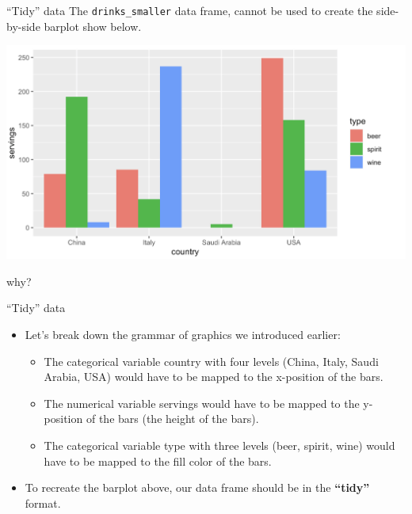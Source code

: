 \documentclass[
  ignorenonframetext,
]{beamer}
\begin{document}
\begin{frame}[fragile]{``Tidy'' data}
\protect\hypertarget{tidy-data-2}{}
The \texttt{drinks\_smaller} data frame, cannot be used to create the
side-by-side barplot show below.

\begin{center}\includegraphics[width=0.6\linewidth,height=0.45\textheight]{week3new1} \end{center}

why?
\end{frame}

\begin{frame}{``Tidy'' data}
\protect\hypertarget{tidy-data-3}{}
\begin{itemize}
\item
  Let's break down the grammar of graphics we introduced earlier:

  \begin{itemize}
  \item
    The categorical variable country with four levels (China, Italy,
    Saudi Arabia, USA) would have to be mapped to the x-position of the
    bars.
  \item
    The numerical variable servings would have to be mapped to the
    y-position of the bars (the height of the bars).
  \item
    The categorical variable type with three levels (beer, spirit, wine)
    would have to be mapped to the fill color of the bars.
  \end{itemize}
\item
  To recreate the barplot above, our data frame should be in the
  \textbf{``tidy''} format.
\end{itemize}
\end{frame}
\end{document}
